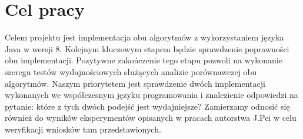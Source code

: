 \section{Cel pracy}

Celem projektu jest implementacja obu algorytmów z wykorzystaniem języka Java w wersji 8.
Kolejnym kluczowym etapem będzie sprawdzenie poprawności obu implementacji.
Pozytywne zakończenie tego etapu pozwoli na wykonanie szeregu testów wydajnościowych służących analizie porównawczej obu algorytmów.
Naszym priorytetem jest sprawdzenie dwóch implementacji wykonanych we współczesnym języku programowania i znalezienie odpowiedzi na pytanie: które z tych dwóch podejść jest wydajniejsze?
Zamierzamy odnosić się również do wyników eksperymentów opisanych w pracach autorstwa J.Pei \cite{closetArt} w celu weryfikacji wniosków tam przedstawionych.
